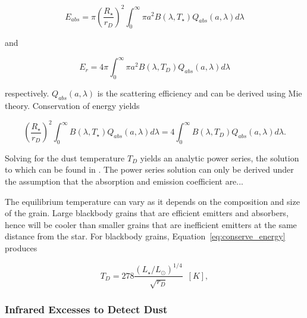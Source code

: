             \begin{equation}\label{eq:energy_absorbed}
            E_{abs} = \pi \left(\frac{R_\star}{r_D}\right)^2 \int_0^\infty \pi a^2 B(\lambda,T_\star) Q_{abs}(a,\lambda) d\lambda
            \end{equation}
            
            and
            
            \begin{equation}\label{eq:energy_emitted}
            E_{r} = 4\pi \int_0^\infty \pi a^2 B(\lambda,T_D) Q_{abs}(a,\lambda) d\lambda
            \end{equation}
            
            respectively. $Q_{abs}(a,\lambda)$ is the scattering efficiency and can be derived using Mie theory. Conservation of energy yields
            
            \begin{equation}\label{eq:conserve_energy}
             \left(\frac{R_\star}{r_D}\right)^2 \int_0^\infty B(\lambda,T_\star) Q_{abs}(a,\lambda) d\lambda = 4 \int_0^\infty B(\lambda,T_D) Q_{abs}(a,\lambda) d\lambda.
            \end{equation}
            
            Solving for the dust temperature $T_D$ yields an analytic power series, the solution to which can be found in \citet{Backman1993}.  The power series solution can only be derived under the assumption that the absorption and emission coefficient are...
            
            The equilibrium temperature can vary as it depends on the composition and size of the grain. Large blackbody grains that are efficient emitters and absorbers, hence will be cooler than smaller grains that are inefficient emitters at the same distance from the star. For blackbody grains, Equation~\ref{eq:conserve_energy} produces
            
            \begin{equation}\label{eq:blackbody_temp}
            T_D = 278 \frac{\left(L_\star/L_\odot \right)^{1/4}}{\sqrt{r_D}}\enspace [K] , 
            \end{equation}
            
           
            
        \subsubsection{Infrared Excesses to Detect Dust}            
            
